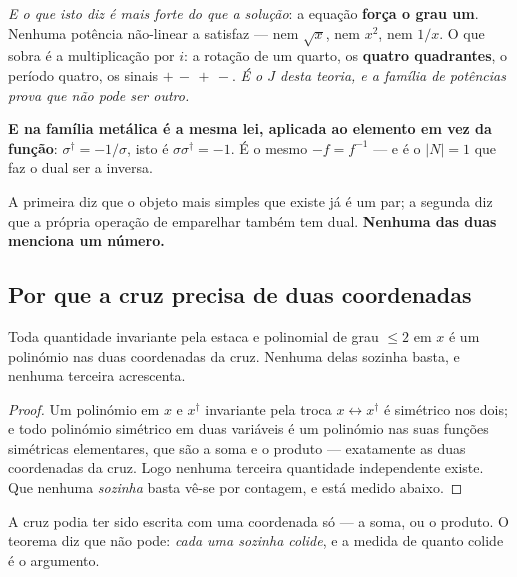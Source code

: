 \documentclass[livro.tex]{subfiles}
\begin{document}
\medskip
\noindent \emph{E o que isto diz é mais forte do que a solução}: a equação \textbf{força o grau
um}. Nenhuma potência não-linear a satisfaz --- nem $\sqrt x$, nem $x^2$, nem $1/x$. O que sobra é
a multiplicação por $i$: a rotação de um quarto, os \textbf{quatro quadrantes}, o período quatro, os
sinais $+\,-\,+\,-$. \emph{É o $J$ desta teoria, e a família de potências prova que não pode ser
outro.}

\medskip
\noindent \textbf{E na família metálica é a mesma lei, aplicada ao elemento em vez da função}:
$\sigma^{\dagger}=-1/\sigma$, isto é $\sigma\sigma^{\dagger}=-1$. É o mesmo $-f=f^{-1}$ --- e é o
$|N|=1$ que faz o dual ser a inversa.


\noindent A primeira diz que o objeto mais simples que existe já é um par; a segunda diz que a
própria operação de emparelhar também tem dual. \textbf{Nenhuma das duas menciona um número.}

\subsection{Por que a cruz precisa de duas coordenadas}\label{sec:cruzduas}

\begin{teorema}\label{thm:cruzunica}
Toda quantidade invariante pela estaca e polinomial de grau ${\leq}2$ em $x$ é um polinómio nas
duas coordenadas da cruz. Nenhuma delas sozinha basta, e nenhuma terceira acrescenta.
\end{teorema}

\begin{proof}
Um polinómio em $x$ e $x^{\dagger}$ invariante pela troca $x\leftrightarrow x^{\dagger}$ é
simétrico nos dois; e todo polinómio simétrico em duas variáveis é um polinómio nas suas funções
simétricas elementares, que são a soma e o produto --- exatamente as duas coordenadas da cruz.
Logo nenhuma terceira quantidade independente existe. Que nenhuma \emph{sozinha} basta vê-se por
contagem, e está medido abaixo. \end{proof}

\noindent A cruz podia ter sido escrita com uma coordenada só --- a soma, ou o produto. O teorema
diz que não pode: \emph{cada uma sozinha colide}, e a medida de quanto colide é o argumento.
\end{document}
